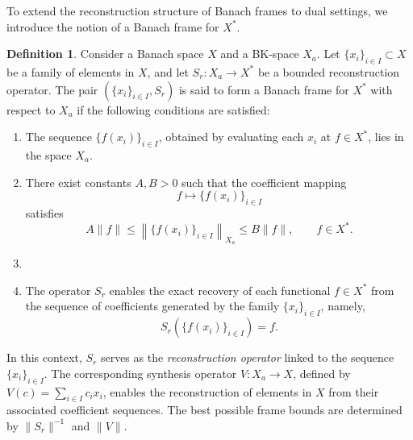 \documentclass[12pt]{article}
\theoremstyle{definition}
\newtheorem{definition}[theorem]{Definition}
\theoremstyle{remark}
\begin{document}
\medskip

To extend the reconstruction structure of Banach frames to dual settings, we introduce the notion of a Banach frame for \(X^*\).
\medskip

\begin{definition}
    Consider a Banach space \( X \) and a BK-space \( X_a \). Let \( \{x_i\}_{i \in I} \subset X \) be a family of elements in \( X \), and let \( S_r : X_a \rightarrow X^* \) be a bounded reconstruction operator. The pair \((\{x_i\}_{i\in I},S_r)\) is said to form a Banach frame for \(X^*\) 
    with respect to \(X_a\) if the following conditions are satisfied:

    \begin{enumerate}
        \item The sequence \( \{f(x_i)\}_{i \in I} \), obtained by evaluating each \( x_i \) at \( f \in X^* \), lies in the space \( X_a \).
        
     \item There exist constants \(A,B>0\) such that the coefficient mapping
        \[
        f\mapsto \{f(x_i)\}_{i\in I}
        \]
        satisfies
        \[
        A\|f\|\leq \left\|\{f(x_i)\}_{i\in I}\right\|_{X_a}\leq B\|f\|,
        \qquad f\in X^*.
        \]
        
        \item \item The operator \(S_r\) enables the exact recovery of each functional \(f\in X^*\) from the sequence of coefficients generated by the family \(\{x_i\}_{i\in I}\), namely,
        \[
        S_r\left(\{f(x_i)\}_{i\in I}\right)=f.
        \]
    \end{enumerate}


In this context, \( S_r \) serves as the \emph{reconstruction operator} linked to the sequence \( \{x_i\}_{i \in I} \). The corresponding synthesis operator \( V : X_a \rightarrow X \), defined by \( V(c) = \sum_{i \in I} c_i x_i \), enables the reconstruction of elements in \( X \) from their associated coefficient sequences. The best possible frame bounds are determined by \( \|S_r\|^{-1} \) and \( \|V\| \).
\end{definition}
\end{document}

